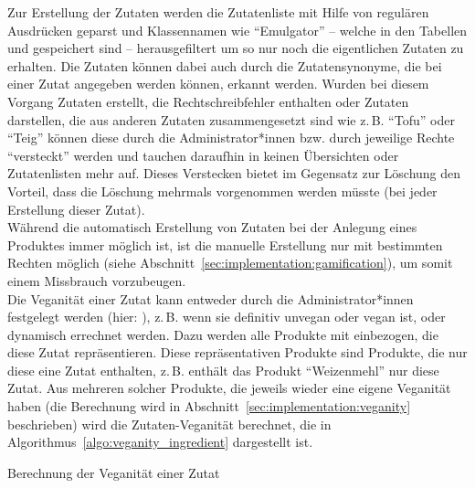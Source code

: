 Zur Erstellung der Zutaten werden die Zutatenliste mit Hilfe von regulären 
Ausdrücken geparst und Klassennamen wie "`Emulgator"' -- welche in den Tabellen
 und  gespeichert sind --
herausgefiltert um so nur noch die eigentlichen Zutaten zu erhalten.
Die Zutaten können dabei auch durch die Zutatensynonyme, die bei einer Zutat 
angegeben werden können, erkannt werden. Wurden bei diesem Vorgang Zutaten 
erstellt, die Rechtschreibfehler enthalten oder Zutaten darstellen, die aus 
anderen Zutaten zusammengesetzt sind wie z.\,B. "`Tofu"' oder "`Teig"' können 
diese durch die Administrator*innen bzw. durch jeweilige Rechte "`versteckt"' 
werden und tauchen daraufhin in keinen Übersichten oder 
Zutatenlisten mehr auf. Dieses Verstecken bietet im Gegensatz zur Löschung 
den Vorteil, dass die Löschung mehrmals vorgenommen werden müsste (bei jeder 
Erstellung dieser Zutat).\\
Während die automatisch Erstellung von Zutaten bei der Anlegung eines Produktes 
immer möglich ist, ist die manuelle Erstellung nur mit 
bestimmten Rechten möglich (siehe 
Abschnitt~\ref{sec:implementation:gamification}), um somit einem Missbrauch 
vorzubeugen.\\
Die Veganität einer Zutat kann entweder durch die Administrator*innen 
festgelegt werden (hier: ), z.\,B. wenn sie definitiv unvegan oder 
vegan ist, oder dynamisch errechnet werden.
Dazu werden alle Produkte mit einbezogen, die diese Zutat repräsentieren.
Diese repräsentativen Produkte sind Produkte, die nur diese eine Zutat 
enthalten, z.\,B. enthält das Produkt "`Weizenmehl"' nur diese Zutat. Aus 
mehreren solcher Produkte, die jeweils wieder eine eigene Veganität haben (die 
Berechnung wird in Abschnitt~\ref{sec:implementation:veganity} beschrieben) 
wird die Zutaten-Veganität berechnet, die in 
Algorithmus~\ref{algo:veganity_ingredient} dargestellt ist.

\begin{algorithm}[ht]
  \SetAlgoLined
  \BlankLine

 
  \caption{Berechnung der Veganität einer Zutat}
  \label{algo:veganity_ingredient}
\end{algorithm}

